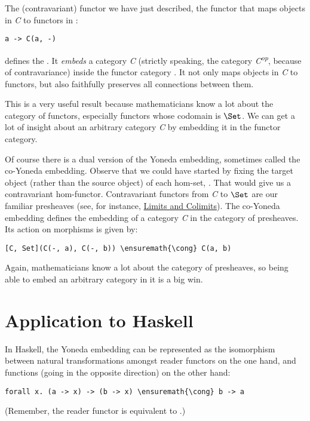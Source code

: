 The (contravariant) functor we have just described, the functor that
maps objects in \emph{C} to functors in \code{{[}C, Set{]}}:

\begin{Verbatim}[commandchars=\\\{\}]
a -> C(a, -)
\end{Verbatim}
defines the . It \emph{embeds} a category
\emph{C} (strictly speaking, the category \emph{C\textsuperscript{op}},
because of contravariance) inside the functor category
\code{{[}C, Set{]}}. It not only maps objects in \emph{C} to
functors, but also faithfully preserves all connections between them.

This is a very useful result because mathematicians know a lot about the
category of functors, especially functors whose codomain is
$\Set$. We can get a lot of insight about an arbitrary category
\emph{C} by embedding it in the functor category.

Of course there is a dual version of the Yoneda embedding, sometimes
called the co-Yoneda embedding. Observe that we could have started by
fixing the target object (rather than the source object) of each
hom-set, . That would give us a contravariant
hom-functor. Contravariant functors from \emph{C} to $\Set$ are
our familiar presheaves (see, for instance,
\hyperref[limits-and-colimits]{Limits
and Colimits}). The co-Yoneda embedding defines the embedding of a
category \emph{C} in the category of presheaves. Its action on morphisms
is given by:

\begin{Verbatim}[commandchars=\\\{\}]
[C, Set](C(-, a), C(-, b)) \ensuremath{\cong} C(a, b)
\end{Verbatim}
Again, mathematicians know a lot about the category of presheaves, so
being able to embed an arbitrary category in it is a big win.

\section{Application to Haskell}\label{application-to-haskell}

In Haskell, the Yoneda embedding can be represented as the isomorphism
between natural transformations amongst reader functors on the one hand,
and functions (going in the opposite direction) on the other hand:

\begin{Verbatim}[commandchars=\\\{\}]
forall x. (a -> x) -> (b -> x) \ensuremath{\cong} b -> a
\end{Verbatim}
(Remember, the reader functor is equivalent to
.)

